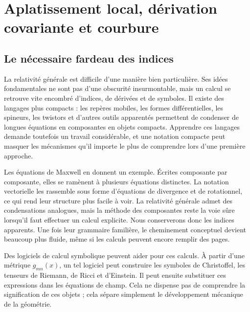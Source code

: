 \chapter{Aplatissement local, dérivation covariante et courbure}


\section{Le nécessaire fardeau des indices}

La relativité générale est difficile d’une manière bien particulière. Ses idées fondamentales ne sont pas d’une obscurité insurmontable, mais un calcul se retrouve vite encombré d’indices, de dérivées et de symboles. Il existe des langages plus compacts : les repères mobiles, les formes différentielles, les spineurs, les twistors et d’autres outils apparentés permettent de condenser de longues équations en composantes en objets compacts. Apprendre ces langages demande toutefois un travail considérable, et une notation compacte peut masquer les mécanismes qu’il importe le plus de comprendre lors d’une première approche.

Les équations de Maxwell en donnent un exemple. Écrites composante par composante, elles se ramènent à plusieurs équations distinctes. La notation vectorielle les rassemble sous forme d’équations de divergence et de rotationnel, ce qui rend leur structure plus facile à voir. La relativité générale admet des condensations analogues, mais la méthode des composantes reste la voie sûre lorsqu’il faut effectuer un calcul explicite. Nous conserverons donc les indices apparents. Une fois leur grammaire familière, le cheminement conceptuel devient beaucoup plus fluide, même si les calculs peuvent encore remplir des pages.

Des logiciels de calcul symbolique peuvent aider pour ces calculs. À partir d’une métrique \(g_{mn}(x)\), un tel logiciel peut construire les symboles de Christoffel, les tenseurs de Riemann, de Ricci et d’Einstein. Il peut ensuite substituer ces expressions dans les équations de champ. Cela ne dispense pas de comprendre la signification de ces objets ; cela sépare simplement le développement mécanique de la géométrie.

